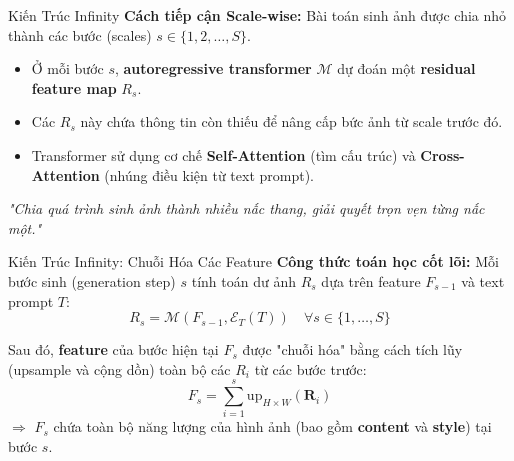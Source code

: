 \documentclass[aspectratio=169, 10pt]{beamer}
\begin{document}
	\begin{frame}{Kiến Trúc Infinity}
		\textbf{Cách tiếp cận Scale-wise:} Bài toán sinh ảnh được chia nhỏ thành các bước (scales) $s \in \{1, 2, \dots, S\}$.
		\begin{itemize}
			\item Ở mỗi bước $s$, \textbf{autoregressive transformer} $\mathcal{M}$ dự đoán một \textbf{residual feature map} $R_s$.
			\item Các $R_s$ này chứa thông tin còn thiếu để nâng cấp bức ảnh từ scale trước đó.
			\item Transformer sử dụng cơ chế \textbf{Self-Attention} (tìm cấu trúc) và \textbf{Cross-Attention} (nhúng điều kiện từ text prompt).
		\end{itemize}
		\vspace{0.3cm}
		\begin{center}
			\textit{"Chia quá trình sinh ảnh thành nhiều nấc thang, giải quyết trọn vẹn từng nấc một."}
		\end{center}
	\end{frame}
	
	\begin{frame}{Kiến Trúc Infinity: Chuỗi Hóa Các Feature}
		\textbf{Công thức toán học cốt lõi:}
		Mỗi bước sinh (generation step) $s$ tính toán dư ảnh $R_s$ dựa trên feature $F_{s-1}$ và text prompt $T$:
		\begin{equation}
			{R}_s = \mathcal{M}({F}_{s-1}, \mathcal{E}_T({T})) \quad \forall s \in \{1, \dots, S\}
		\end{equation}
		
		Sau đó, \textbf{feature} của bước hiện tại $F_s$ được "chuỗi hóa" bằng cách tích lũy (upsample và cộng dồn) toàn bộ các $R_i$ từ các bước trước:
		\begin{equation}
			{F}_s = \sum_{i=1}^{s} \text{up}_{H\times W}(\mathbf{R}_i)
		\end{equation}
		$\Rightarrow$ $F_s$ chứa toàn bộ năng lượng của hình ảnh (bao gồm \textbf{content} và \textbf{style}) tại bước $s$.
	\end{frame}
	
	
\end{document}
